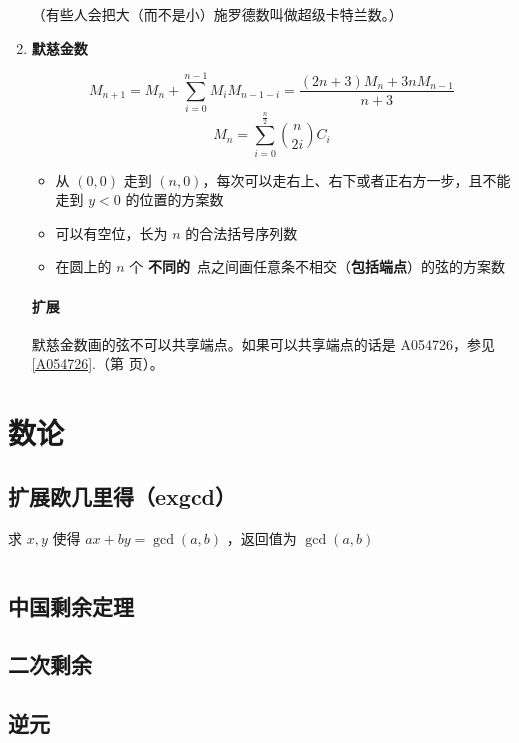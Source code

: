 \documentclass[a4paper, twoside]{article}
\newcommand\detailedref[1]{\ref{#1}.\nameref{#1}（第 \pageref{#1} 页）}
\begin{document}
\begin{enumerate}
        （有些人会把大（而不是小）施罗德数叫做超级卡特兰数。）
        
        \item \textbf{默慈金数}
        
        $$ M_{n + 1} = M_n + \sum_{i = 0} ^ {n - 1} M_i M_{n - 1 - i} = \frac {(2n + 3)M_n + 3n M_{n - 1}} {n + 3} $$
        $$ M_n = \sum_{i = 0} ^ {\frac {n}{2}} \binom{n}{2i} C_i $$
        
        \begin{itemize}
            \item 从 $(0, 0)$ 走到 $(n, 0)$，每次可以走右上、右下或者正右方一步，且不能走到 $y<0$ 的位置的方案数
            \item 可以有空位，长为 $n$ 的合法括号序列数
            \item 在圆上的 $n$ 个 \textbf{不同的}\ 点之间画任意条不相交（\textbf{包括端点}）的弦的方案数
        \end{itemize}
        
        \paragraph{扩展} 默慈金数画的弦不可以共享端点。如果可以共享端点的话是 A054726，参见 \detailedref{A054726}。
        
    \end{enumerate}
        
    
\newpage
\section{数论}
\subsection{扩展欧几里得（exgcd）}
求 $x, y$ 使得 $ax+by=\gcd(a, b)$ ，返回值为 $\gcd(a, b)$
\inputminted{cpp}{../src/数论/扩展欧几里得（exgcd）.cpp}

\subsection{中国剩余定理}

\subsection{二次剩余}

\subsection{逆元}
\end{document}
